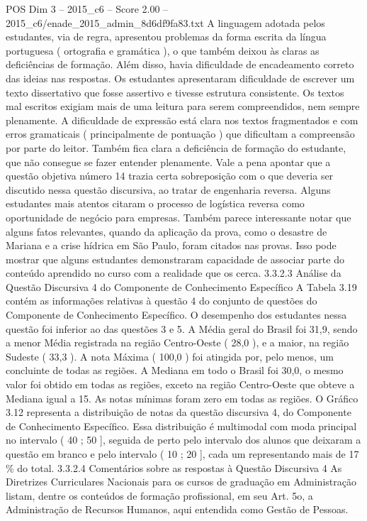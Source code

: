 \begin{textsample}{POS Dim 3 – 2015\_c6 – Score 2.00 – 2015\_c6/enade\_2015\_admin\_8d6df9fa83.txt}
A linguagem adotada pelos estudantes, via de regra, apresentou problemas da forma escrita da língua portuguesa ( ortografia e gramática ), o que também deixou às claras as deficiências de formação.
Além disso, havia dificuldade de encadeamento correto das ideias nas respostas.
Os estudantes apresentaram dificuldade de escrever um texto dissertativo que fosse assertivo e tivesse estrutura consistente.
Os textos mal escritos exigiam mais de uma leitura para serem compreendidos, nem sempre plenamente.
A dificuldade de expressão está clara nos textos fragmentados e com erros gramaticais ( principalmente de pontuação ) que dificultam a compreensão por parte do leitor.
Também fica clara a deficiência de formação do estudante, que não consegue se fazer entender plenamente.
Vale a pena apontar que a questão objetiva número 14 trazia certa sobreposição com o que deveria ser discutido nessa questão discursiva, ao tratar de engenharia reversa.
Alguns estudantes mais atentos citaram o processo de logística reversa como oportunidade de negócio para empresas.
Também parece interessante notar que alguns fatos relevantes, quando da aplicação da prova, como o desastre de Mariana e a crise hídrica em São Paulo, foram citados nas provas.
Isso pode mostrar que alguns estudantes demonstraram capacidade de associar parte do conteúdo aprendido no curso com a realidade que os cerca. 3.3.2.3 Análise da Questão Discursiva 4 do Componente de Conhecimento Específico A Tabela 3.19 contém as informações relativas à questão 4 do conjunto de questões do Componente de Conhecimento Específico.
O desempenho dos estudantes nessa questão foi inferior ao das questões 3 e 5.
A Média geral do Brasil foi 31,9, sendo a menor Média registrada na região Centro-Oeste ( 28,0 ), e a maior, na região Sudeste ( 33,3 ).
A nota Máxima ( 100,0 ) foi atingida por, pelo menos, um concluinte de todas as regiões.
A Mediana em todo o Brasil foi 30,0, o mesmo valor foi obtido em todas as regiões, exceto na região Centro-Oeste que obteve a Mediana igual a 15.
As notas mínimas foram zero em todas as regiões.
O Gráfico 3.12 representa a distribuição de notas da questão discursiva 4, do Componente de Conhecimento Específico.
Essa distribuição é multimodal com moda principal no intervalo ( 40 ; 50 ], seguida de perto pelo intervalo dos alunos que deixaram a questão em branco e pelo intervalo ( 10 ; 20 ], cada um representando mais de 17 \% do total. 3.3.2.4 Comentários sobre as respostas à Questão Discursiva 4 As Diretrizes Curriculares Nacionais para os cursos de graduação em Administração listam, dentre os conteúdos de formação profissional, em seu Art. 5o, a Administração de Recursos Humanos, aqui entendida como Gestão de Pessoas.

\end{textsample}
